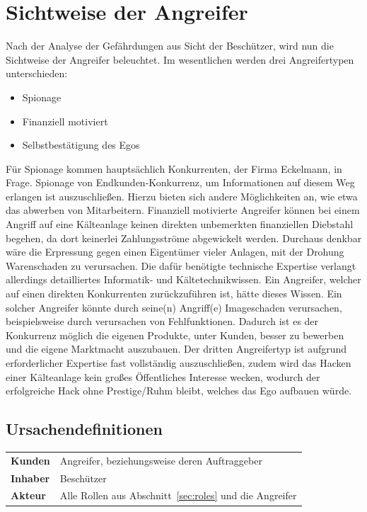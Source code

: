 \documentclass[11pt,a4paper]{report}
\begin{document}
\section{Sichtweise der Angreifer}

Nach der Analyse der Gefährdungen aus Sicht der Beschützer, wird nun die Sichtweise der Angreifer beleuchtet. Im wesentlichen werden drei Angreifertypen unterschieden:

\begin{itemize}[leftmargin=*]
\item Spionage
\item Finanziell motiviert
\item Selbstbestätigung des Egos
\end{itemize}

Für Spionage kommen hauptsächlich Konkurrenten, der Firma Eckelmann, in Frage. Spionage von Endkunden-Konkurrenz, um Informationen auf diesem Weg erlangen ist auszuschließen. Hierzu bieten sich andere Möglichkeiten an, wie etwa das abwerben von Mitarbeitern. Finanziell motivierte Angreifer können bei einem Angriff auf eine Kälteanlage keinen direkten unbemerkten finanziellen Diebstahl begehen, da dort keinerlei Zahlungsströme abgewickelt werden. Durchaus denkbar wäre die Erpressung gegen einen Eigentümer vieler Anlagen, mit der Drohung Warenschaden zu verursachen. Die dafür benötigte technische Expertise verlangt allerdings detailliertes Informatik- und Kältetechnikwissen. Ein Angreifer, welcher auf einen direkten Konkurrenten zurückzuführen ist, hätte dieses Wissen. Ein solcher Angreifer könnte durch seine(n) Angriff(e) Imageschaden verursachen, beispielsweise durch verursachen von Fehlfunktionen. Dadurch ist es der Konkurrenz möglich die eigenen Produkte, unter Kunden, besser zu bewerben und die eigene Marktmacht auszubauen. Der dritten Angreifertyp ist aufgrund erforderlicher Expertise fast vollständig auszuschließen, zudem wird das Hacken einer Kälteanlage kein großes Öffentliches Interesse wecken, wodurch der erfolgreiche Hack ohne Prestige/Ruhm bleibt, welches das Ego aufbauen würde.

\subsection{Ursachendefinitionen}

\begin{table}[h] %
\begin{tabularx}{\linewidth}{@{}lX@{}}
\textbf{Kunden} & Angreifer, beziehungsweise deren Auftraggeber\\
\textbf{Inhaber} & Beschützer\\
\textbf{Akteur} & Alle Rollen aus Abschnitt~\ref{sec:roles} und die Angreifer\\
\end{tabularx}
\end{table}
\end{document}
